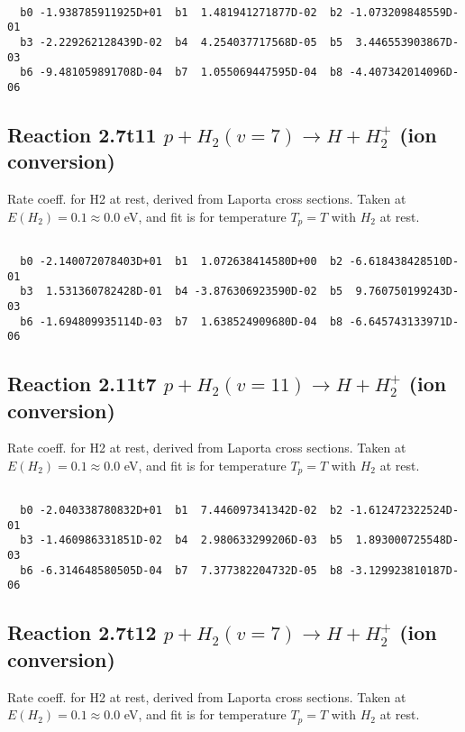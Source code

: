 \begin{small}\begin{verbatim}

  b0 -1.938785911925D+01  b1  1.481941271877D-02  b2 -1.073209848559D-01
  b3 -2.229262128439D-02  b4  4.254037717568D-05  b5  3.446553903867D-03
  b6 -9.481059891708D-04  b7  1.055069447595D-04  b8 -4.407342014096D-06

\end{verbatim}\end{small}

\newpage
\subsection{
Reaction 2.7t11
$ p + H_2(v=7) \rightarrow H + H_2^+$ (ion conversion)
}
Rate coeff. for H2 at rest, derived from Laporta cross sections.
Taken at $E(H_2) = 0.1 \approx 0.0$ eV,  and fit is for temperature $T_p=T$ with $H_2$ at rest.

\begin{small}\begin{verbatim}

  b0 -2.140072078403D+01  b1  1.072638414580D+00  b2 -6.618438428510D-01
  b3  1.531360782428D-01  b4 -3.876306923590D-02  b5  9.760750199243D-03
  b6 -1.694809935114D-03  b7  1.638524909680D-04  b8 -6.645743133971D-06

\end{verbatim}\end{small}

\newpage
\subsection{
Reaction 2.11t7
$ p + H_2(v=11) \rightarrow H + H_2^+$ (ion conversion)
}
Rate coeff. for H2 at rest, derived from Laporta cross sections.
Taken at $E(H_2) = 0.1 \approx 0.0$ eV,  and fit is for temperature $T_p=T$ with $H_2$ at rest.

\begin{small}\begin{verbatim}

  b0 -2.040338780832D+01  b1  7.446097341342D-02  b2 -1.612472322524D-01
  b3 -1.460986331851D-02  b4  2.980633299206D-03  b5  1.893000725548D-03
  b6 -6.314648580505D-04  b7  7.377382204732D-05  b8 -3.129923810187D-06

\end{verbatim}\end{small}

\newpage
\subsection{
Reaction 2.7t12
$ p + H_2(v=7) \rightarrow H + H_2^+$ (ion conversion)
}
Rate coeff. for H2 at rest, derived from Laporta cross sections.
Taken at $E(H_2) = 0.1 \approx 0.0$ eV,  and fit is for temperature $T_p=T$ with $H_2$ at rest.

